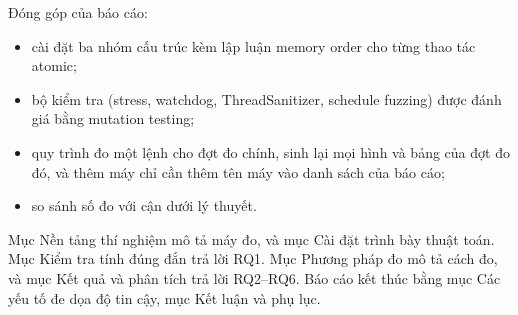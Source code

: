 Đóng góp của báo cáo:
\begin{itemize}[nosep]
  \item cài đặt ba nhóm cấu trúc kèm lập luận memory order cho từng thao tác atomic;
  \item bộ kiểm tra (stress, watchdog, ThreadSanitizer, schedule fuzzing) được đánh giá bằng mutation
    testing;
  \item quy trình đo một lệnh cho đợt đo chính, sinh lại mọi hình và bảng của đợt đo đó, và thêm máy chỉ
    cần thêm tên máy vào danh sách của báo cáo;
  \item so sánh số đo với cận dưới lý thuyết.
\end{itemize}

Mục Nền tảng thí nghiệm mô tả máy đo, và mục Cài đặt trình bày thuật toán. Mục Kiểm tra tính đúng đắn
trả lời RQ1. Mục Phương pháp đo mô tả cách đo, và mục Kết quả và phân tích trả lời RQ2--RQ6. Báo cáo kết
thúc bằng mục Các yếu tố đe dọa độ tin cậy, mục Kết luận và phụ lục.
